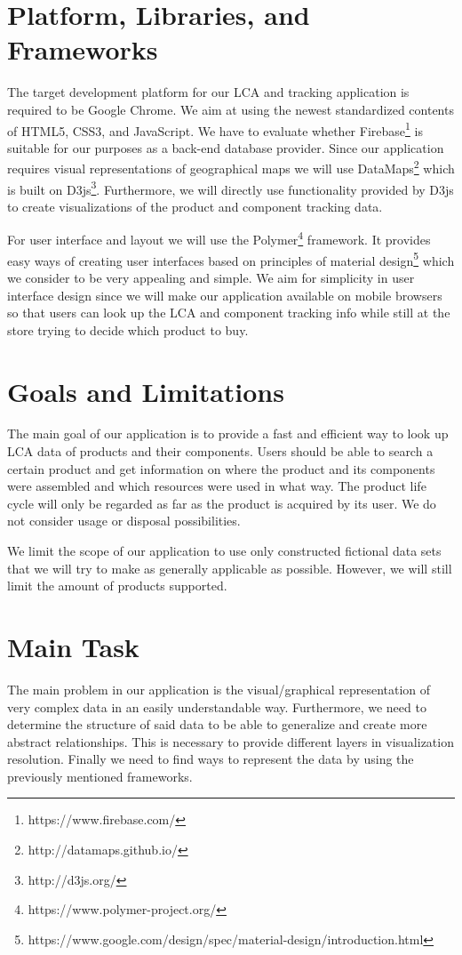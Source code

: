 \documentclass[a4page]{article}
\begin{document}
\section{Platform, Libraries, and Frameworks}
The target development platform for our \ac{LCA} and tracking application is required to be Google Chrome. 
We aim at using the newest standardized contents of HTML5, CSS3, and JavaScript. We have to evaluate whether Firebase\footnote{https://www.firebase.com/} is suitable for our purposes as a back-end database provider.
Since our application requires visual representations of geographical maps we will use DataMaps\footnote{http://datamaps.github.io/} which is built on D3js\footnote{http://d3js.org/}.
Furthermore, we will directly use functionality provided by D3js to create visualizations of the product and component tracking data.

For user interface and layout we will use the Polymer\footnote{https://www.polymer-project.org/} framework. 
It provides easy ways of creating user interfaces based on principles of material design\footnote{https://www.google.com/design/spec/material-design/introduction.html} which we consider to be very appealing and simple.
We aim for simplicity in user interface design since we will make our application available on mobile browsers so that users can look up the \ac{LCA} and component tracking info while still at the store trying to decide which product to buy.

\section{Goals and Limitations}
The main goal of our application is to provide a fast and efficient way to look up \ac{LCA} data of products and their components.
Users should be able to search a certain product and get information on where the product and its components were assembled and which resources were used in what way.
The product life cycle will only be regarded as far as the product is acquired by its user.
We do not consider usage or disposal possibilities. 


We limit the scope of our application to use only constructed fictional data sets that we will try to make as generally applicable as possible. However, we will still limit the amount of products supported.

\section{Main Task}
The main problem in our application is the visual/graphical representation of very complex data in an easily understandable way.
Furthermore, we need to determine the structure of said data to be able to generalize and create more abstract relationships.
This is necessary to provide different layers in visualization resolution.
Finally we need to find ways to represent the data by using the previously mentioned frameworks.
\end{document}
